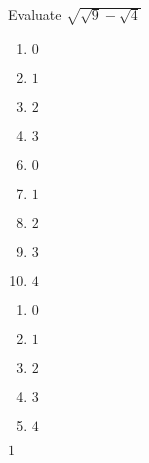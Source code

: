 

 Evaluate $\sqrt{\sqrt{9}-\sqrt{4}}$


\ifsat
	\begin{enumerate}[label=\Alph*)]
		\item   $0$
		\item  $1$%
		\item  $2$
		\item  $3$
	\end{enumerate}
\else
\fi

\ifacteven
	\begin{enumerate}[label=\textbf{\Alph*.},itemsep=\fill,align=left]
		\setcounter{enumii}{5}
		\item   $0$
		\item  $1$%
		\item  $2$
		\addtocounter{enumii}{1}
		\item  $3$
		\item   $4$
	\end{enumerate}
\else
\fi

\ifactodd
	\begin{enumerate}[label=\textbf{\Alph*.},itemsep=\fill,align=left]
		\item   $0$
		\item  $1$%
		\item  $2$
		\item  $3$
		\item   $4$
	\end{enumerate}
\else
\fi

\ifgridin
  $1$%
		
\else
\fi

